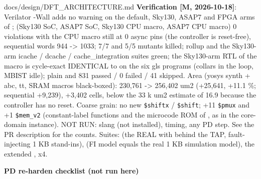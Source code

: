 \begin{relocated}{docs/design/DFT_ARCHITECTURE.md}
\textbf{Verification {[}M, 2026-10-18{]}}: Verilator -Wall adds no
warning on the default, Sky130, ASAP7 and FPGA arms of
;  (Sky130 SoC, ASAP7 SoC,
Sky130 CPU macro, ASAP7 CPU macro) 0 violations with the CPU macro still
at 0 async pins (the controller is reset-free), sequential words 944
-\textgreater{} 1033;  7/7 and 5/5 mutants
killed;  rollup and the Sky130-arm icache / dcache /
cache\_\allowbreak{}integration suites green; the Sky130-arm RTL of the
macro is cycle-exact IDENTICAL to  on the six gls
programs (collars in the loop, MBIST idle);  plain and
 831 passed / 0 failed / 41 skipped. Area (yosys synth +
abc, tt, SRAM macros black-boxed): 230,761 -\textgreater{} 256,402 um2
(+25,641, +11.1 \%; sequential +9,239), +3,402 cells, below the 33 k um2
estimate of 16.9 because the controller has no reset. Coarse grain: no
new \texttt{\$shiftx} / \texttt{\$shift}; +11 \texttt{\$pmux} and +1
\texttt{\$mem\_\allowbreak{}v2} (constant-label  functions
and the microcode ROM of , as in the core-domain
instance). NOT RUN: slang (not installed), timing, any PD step. See the
PR description for the counts. Suites:  (the REAL
 with  behind the TAP,
fault-injecting 1 KB stand-ins),  (FI model
equals the real 1 KB simulation model), the extended ,
 x4.

\textbf{PD re-harden checklist (not run here)}


\end{relocated}
